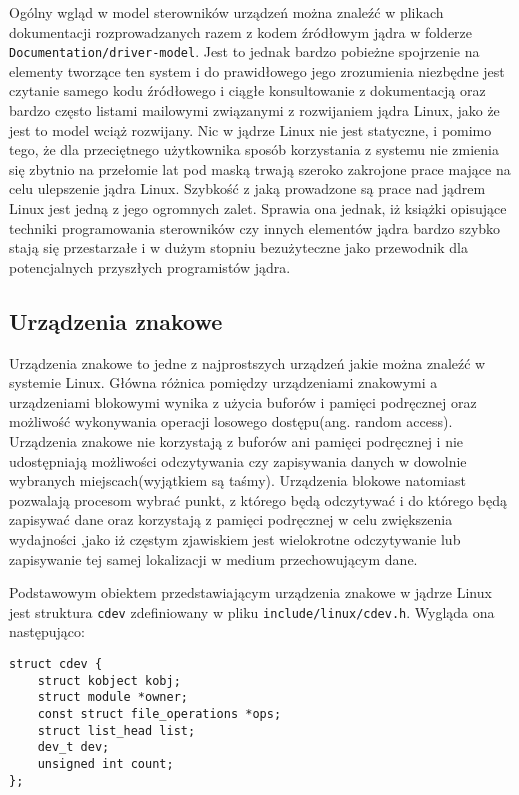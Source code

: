 \documentclass[10pt]{scrartcl}
\begin{document}
Ogólny wgląd w model sterowników urządzeń można znaleźć w plikach dokumentacji rozprowadzanych razem z kodem źródłowym jądra w folderze \newline\texttt{Documentation/driver-model}. Jest to jednak bardzo pobieżne spojrzenie na elementy tworzące ten system i do prawidłowego jego zrozumienia niezbędne jest czytanie samego kodu źródłowego i ciągłe konsultowanie z dokumentacją oraz bardzo często listami mailowymi związanymi z rozwijaniem jądra Linux, jako że jest to model wciąż rozwijany. Nic w jądrze Linux nie jest statyczne, i pomimo tego, że dla przeciętnego użytkownika sposób korzystania z systemu nie zmienia się zbytnio na przełomie lat pod maską trwają szeroko zakrojone prace mające na celu ulepszenie jądra Linux. Szybkość z jaką prowadzone są prace nad jądrem Linux jest jedną z jego ogromnych zalet. Sprawia ona jednak, iż książki opisujące techniki programowania sterowników czy innych elementów jądra bardzo szybko stają się przestarzałe i w dużym stopniu bezużyteczne jako przewodnik dla potencjalnych przyszłych programistów jądra.

\subsection{Urządzenia znakowe}
\label{chardevs}

Urządzenia znakowe to jedne z najprostszych urządzeń jakie można znaleźć w systemie Linux. Główna różnica pomiędzy urządzeniami znakowymi a urządzeniami blokowymi wynika z użycia buforów i pamięci podręcznej oraz możliwość wykonywania operacji losowego dostępu(ang. random access).  Urządzenia znakowe nie korzystają z buforów ani pamięci podręcznej i nie udostępniają możliwości odczytywania czy zapisywania danych w dowolnie wybranych miejscach(wyjątkiem są taśmy). Urządzenia blokowe natomiast pozwalają procesom wybrać punkt, z którego będą odczytywać i do którego będą zapisywać dane oraz korzystają z pamięci podręcznej w celu zwiększenia wydajności ,jako iż częstym zjawiskiem jest wielokrotne odczytywanie lub zapisywanie tej samej lokalizacji w medium przechowującym dane.

Podstawowym obiektem przedstawiającym urządzenia znakowe w jądrze Linux jest struktura \texttt{cdev} zdefiniowany w pliku \texttt{include/linux/cdev.h}. Wygląda ona następująco:

\begin{verbatim}
struct cdev {
    struct kobject kobj;
    struct module *owner;
    const struct file_operations *ops;
    struct list_head list;
    dev_t dev;
    unsigned int count;
};
\end{verbatim}
\end{document}
